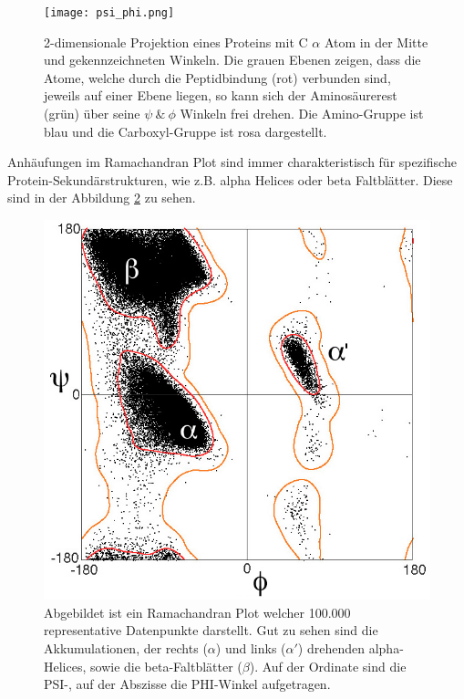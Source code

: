 \begin{figure}[H]
    \centering
    \texttt{[image: psi\_phi.png]}
    \caption{2-dimensionale Projektion eines Proteins mit C $\alpha$ Atom in der Mitte und gekennzeichneten Winkeln. Die grauen Ebenen zeigen, dass die Atome, welche durch die Peptidbindung (rot) verbunden sind, jeweils auf einer Ebene liegen, so kann sich der Aminosäurerest (grün) über seine $\psi\ \&\ \phi$ Winkeln frei drehen. Die Amino-Gruppe ist blau und die Carboxyl-Gruppe ist rosa dargestellt.\protect\footnotemark}
    \label{fig:psi_phi}
\end{figure}

Anhäufungen im Ramachandran Plot sind immer charakteristisch für spezifische Protein-Sekundärstrukturen, wie z.B. alpha Helices oder beta Faltblätter. Diese sind in der Abbildung \ref{fig:ramaplot} zu sehen.

\begin{figure}[H]
    \centering
    \includegraphics[width=.80\textwidth]{images/Ramaplot.png}
    \caption{Abgebildet ist ein Ramachandran Plot welcher 100.000 representative Datenpunkte darstellt. Gut zu sehen sind die Akkumulationen, der rechts ($\alpha$) und links ($\alpha'$) drehenden alpha-Helices, sowie die beta-Faltblätter ($\beta$). Auf der Ordinate sind die PSI-, auf der Abszisse die PHI-Winkel aufgetragen\protect\footnotemark.}
    \label{fig:ramaplot}
\end{figure}

